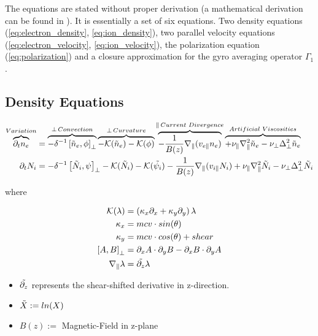 \documentclass[master.tex]{subfiles}
\begin{document}
The equations are stated without proper derivation (a mathematical derivation can be found in \cite{HeldDisseration}). It is essentially a set of six equations. Two density equations (\autoref{eq:electron_density}, \autoref{eq:ion_density}), two parallel velocity equations (\autoref{eq:electron_velocity}, \autoref{eq:ion_velocity}), the polarization equation (\autoref{eq:polarization}) and a closure approximation for the gyro averaging operator $\Gamma_1$.

\subsection{Density Equations}

\begin{align}
    \overbrace{\partial_t n_e}^{Variation} &=
    \overbrace{-\delta^{-1} \left[\Tilde{n}_e, \phi \right]_{\perp}}^{\perp \, Convection}
    \overbrace{
    - \mathcal{K}(\Tilde{n}_e)
    - \mathcal{K}(\phi)
    }^{\perp \, Curvature}
    \overbrace{
    - \frac{1}{B(z)}\nabla_\parallel (v_{e\parallel} n_e)
    }^{\parallel \, Current\,\, Divergence}
    \overbrace{
    + \nu_\parallel \nabla_\parallel^2\Tilde{n}_e
    - \nu_\perp \Delta^2_\perp\Tilde{n}_e
    }^{Artificial\,\, Viscosities}
    \label{eq:electron_density}
    \\
    \partial_t N_i &=
    -\delta^{-1} \left[\Tilde{N}_i, \psi \right]_{\perp}
    - \mathcal{K}(\Tilde{N}_i)
    - \mathcal{K}(\Tilde{\psi_i})
    - \frac{1}{B(z)}\nabla_\parallel (v_{i\parallel} N_i)
    + \nu_\parallel \nabla_\parallel^2\Tilde{N}_i
    - \nu_\perp \Delta^2_\perp\Tilde{N}_i \label{eq:ion_density}
\end{align}

where

\begin{align}
    \mathcal{K}(\lambda) &= (\kappa_x \partial_x + \kappa_y \partial_y)\,\lambda\\
    \kappa_x &= mcv \cdot sin(\theta)\\
    \kappa_y &= mcv \cdot cos(\theta) + shear\\
    \left[A, B\right]_\perp &= \partial_x A \cdot \partial_y B - \partial_x B \cdot \partial_y A\\
    \nabla_\parallel \lambda &= \Tilde{\partial_{z}} \lambda
\end{align}
\begin{itemize}
    \item $\Tilde{\partial_{z}}$ represents the shear-shifted derivative in z-direction.
    \item $\Tilde{X} := ln(X)$
    \item $B(z) := $ Magnetic-Field in z-plane
\end{itemize}
\end{document}
